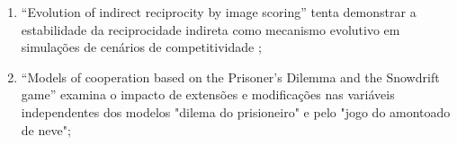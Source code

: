 \begin{enumerate}
\item ``Evolution of indirect reciprocity by image scoring'' tenta demonstrar a estabilidade da reciprocidade indireta como mecanismo evolutivo em simulações de cenários de competitividade ;%
\item ``Models of cooperation based on the Prisoner’s
Dilemma and the Snowdrift game'' examina o impacto de extensões e modificações nas variáveis independentes dos modelos "dilema do prisioneiro" e pelo "jogo do amontoado de neve";%

\end{enumerate}
